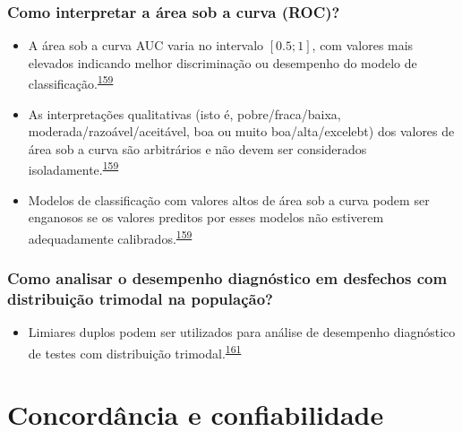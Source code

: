 \documentclass[
  a4paper,
]{book}
\providecommand{\tightlist}{%
  \setlength{\itemsep}{0pt}\setlength{\parskip}{0pt}}
\begin{document}
\hypertarget{como-interpretar-a-uxe1rea-sob-a-curva-roc}{%
\subsection{Como interpretar a área sob a curva (ROC)?}\label{como-interpretar-a-uxe1rea-sob-a-curva-roc}}

\begin{itemize}
\item
  A área sob a curva AUC varia no intervalo \([0.5; 1]\), com valores mais elevados indicando melhor discriminação ou desempenho do modelo de classificação.\textsuperscript{\protect\hyperlink{ref-de2022}{159}}
\item
  As interpretações qualitativas (isto é, pobre/fraca/baixa, moderada/razoável/aceitável, boa ou muito boa/alta/excelebt) dos valores de área sob a curva são arbitrários e não devem ser considerados isoladamente.\textsuperscript{\protect\hyperlink{ref-de2022}{159}}
\item
  Modelos de classificação com valores altos de área sob a curva podem ser enganosos se os valores preditos por esses modelos não estiverem adequadamente calibrados.\textsuperscript{\protect\hyperlink{ref-de2022}{159}}
\end{itemize}

\hypertarget{como-analisar-o-desempenho-diagnuxf3stico-em-desfechos-com-distribuiuxe7uxe3o-trimodal-na-populauxe7uxe3o}{%
\subsection{Como analisar o desempenho diagnóstico em desfechos com distribuição trimodal na população?}\label{como-analisar-o-desempenho-diagnuxf3stico-em-desfechos-com-distribuiuxe7uxe3o-trimodal-na-populauxe7uxe3o}}

\begin{itemize}
\tightlist
\item
  Limiares duplos podem ser utilizados para análise de desempenho diagnóstico de testes com distribuição trimodal.\textsuperscript{\protect\hyperlink{ref-ferreira2021}{161}}
\end{itemize}

\hypertarget{analise-concordancia-confiabilidade}{%
\chapter{\texorpdfstring{\textbf{Concordância e confiabilidade}}{Concordância e confiabilidade}}\label{analise-concordancia-confiabilidade}}
\end{document}
